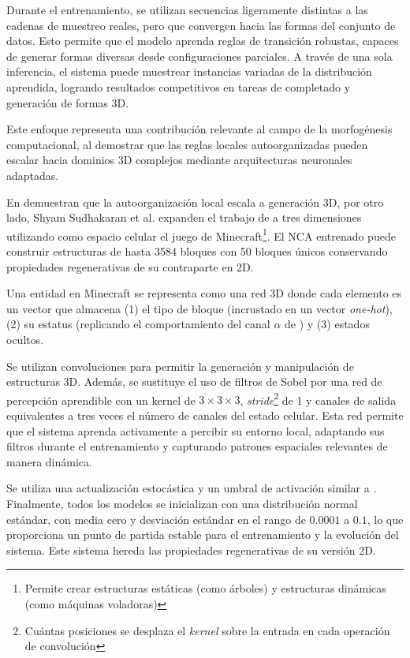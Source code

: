 Durante el entrenamiento, se utilizan secuencias ligeramente distintas a las cadenas de muestreo reales, pero que convergen hacia las formas del conjunto de datos. Esto permite que el modelo aprenda reglas de transición robustas, capaces de generar formas diversas desde configuraciones parciales. A través de una sola inferencia, el sistema puede muestrear instancias variadas de la distribución aprendida, logrando resultados competitivos en tareas de completado y generación de formas 3D.

Este enfoque representa una contribución relevante al campo de la morfogénesis computacional, al demostrar que las reglas locales autoorganizadas pueden escalar hacia dominios 3D complejos mediante arquitecturas neuronales adaptadas.

En \cite{GCA} demuestran que la autoorganización local escala a generación 3D, por otro lado, Shyam Sudhakaran et al. \cite{NCA3D} expanden el trabajo de \cite{mordvintsevNCA} a tres dimensiones utilizando como espacio celular el juego de Minecraft\footnote{Permite crear estructuras estáticas (como árboles) y estructuras dinámicas (como máquinas voladoras)}. El NCA entrenado puede construir estructuras de hasta 3584 bloques con 50 bloques únicos conservando propiedades regenerativas de su contraparte en 2D.

Una entidad en Minecraft se representa como una red 3D donde cada elemento es un vector que almacena (1) el tipo de bloque (incrustado en un vector \textit{one-hot}), (2) su estatus (replicando el comportamiento del canal $\alpha$ de \cite{mordvintsevNCA}) y (3) estados ocultos.

Se utilizan convoluciones para permitir la generación y manipulación de estructuras 3D. Además, se sustituye el uso de filtros de Sobel por una red de percepción aprendible con un kernel de $3 \times 3 \times 3$, \textit{stride}\footnote{Cuántas posiciones se desplaza el \textit{kernel} sobre la entrada en cada operación de convolución} de 1 y canales de salida equivalentes a tres veces el número de canales del estado celular. Esta red permite que el sistema aprenda activamente a percibir su entorno local, adaptando sus filtros durante el entrenamiento y capturando patrones espaciales relevantes de manera dinámica.

Se utiliza una actualización estocástica y un umbral de activación similar a \cite{mordvintsevNCA}. Finalmente, todos los modelos se inicializan con una distribución normal estándar, con media cero y desviación estándar en el rango de $0.0001$ a $0.1$, lo que proporciona un punto de partida estable para el entrenamiento y la evolución del sistema. Este sistema hereda las propiedades regenerativas de su versión 2D.

